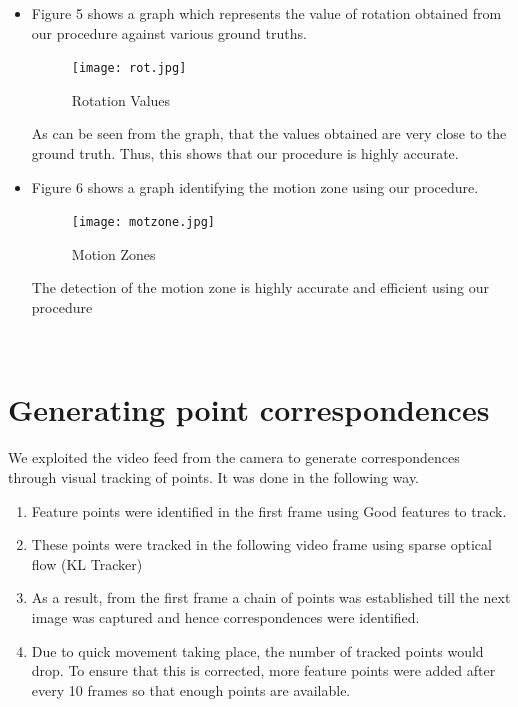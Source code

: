 \documentclass{article}
\begin{document}
\begin{itemize}
			\item Figure 5 shows a graph which represents the value of rotation obtained from our procedure against various ground truths.
				   \begin{figure}
    			      \centering
    			      \texttt{[image: rot.jpg]}
    			      \caption{Rotation Values}
    			\end{figure}
    		As can be seen from the graph, that the values obtained are very close to the ground truth. Thus, this shows that our procedure is highly accurate.
    		

			\item Figure 6 shows a graph identifying the motion zone using our procedure.
			   \begin{figure}
    			      \centering
    			      \texttt{[image: motzone.jpg]}
    			      \caption{Motion Zones}
    			\end{figure}
    		The detection of the motion zone is highly accurate and efficient using our procedure

			\end{itemize} 

		\vspace{3mm}
		\
			\section{Generating point correspondences}
		We exploited the video feed from the camera to generate correspondences through visual tracking of points. It was done in the following way.
		\begin{enumerate}
			\item Feature points were identified in the first frame using Good features to track.
			\item These points were tracked in the following video frame using sparse optical flow (KL Tracker)
			\item As a result, from the first frame a chain of points was established till the next image was captured and hence correspondences were identified.
			\item Due to quick movement taking place, the number of tracked points would drop. To ensure that this is corrected, more feature points were added after every 10 frames so that enough points are available.
		\end{enumerate}
\end{document}
